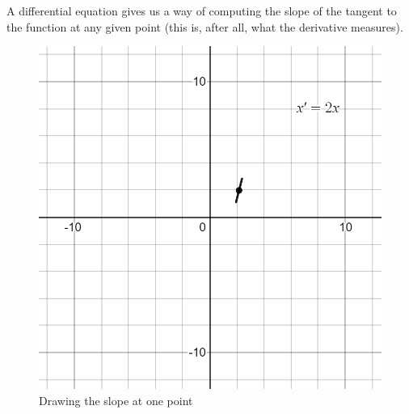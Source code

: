 A differential equation gives us a way of computing the slope of the tangent to the function at any given point (this is, after all, what the derivative measures). 
\begin{figure}[ht]
    \centering
    \includegraphics[scale=0.25]{Images/slope_field_1.png}
    \caption{Drawing the slope at one point}
    \label{fig:slope_one_pt}
\end{figure}

